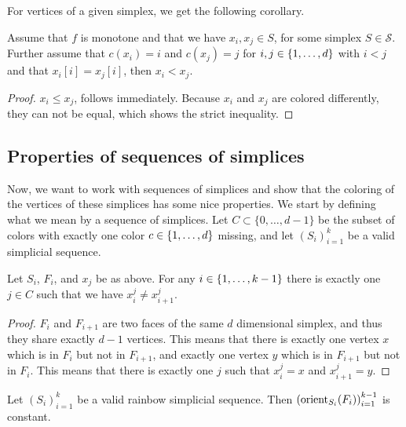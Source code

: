 For vertices of a given simplex, we get the following corollary.
\begin{corollary}\label{cor:monotone_coloring}
	Assume that $f$ is monotone and that we have $x_i, x_j \in S$, for some simplex $S\in \mathcal{S}$. Further assume that $c(x_i) = i$ and $c(x_j) = j$ for $i, j \in \left\{1, \dots, d\right\}$ with $i < j$ and that $x_i[i] = x_j[i]$, then $x_i < x_j$.
\end{corollary}
\begin{proof}
	$x_i \leq x_j$, follows immediately. Because $x_i$ and $x_j$ are colored differently, they can not be equal, which shows the strict inequality.
\end{proof}

\subsection{Properties of sequences of simplices}

Now, we want to work with sequences of simplices and show that the coloring of the vertices of these simplices has some nice properties. We start by defining what we mean by a sequence of simplices. Let $C \subset \{0, \dots, d-1\}$ be the subset of colors with exactly one color $c \in \left\{1, \dots, d\right\}$ missing, and let ${\left(S_i\right)}_{i=1}^k$ be a valid simplicial sequence.
\begin{lemma}
	Let $S_i$, $F_i$, and $x_j$ be as above. For any $i \in \left\{1, \dots, k-1\right\}$ there is exactly one $j \in C$ such that we have $x_i^j \neq x_{i+1}^j$.
\end{lemma}
\begin{proof}
	$F_i$ and $F_{i+1}$ are two faces of the same $d$ dimensional simplex, and thus they share exactly $d-1$ vertices. This means that there is exactly one vertex $x$ which is in $F_i$ but not in $F_{i+1}$, and exactly one vertex $y$ which is in $F_{i+1}$ but not in $F_i$. This means that there is exactly one $j$ such that $x_i^j = x$ and $x_{i+1}^j = y$.
\end{proof}

\begin{lemma}\label{lem:consistent_orientation_of_transition_faces}
	Let ${\left(S_i\right)}_{i=1}^{k}$ be a valid rainbow simplicial sequence. Then ${\left(\operatorname{orient}_{S_i}(F_i)\right)}_{i=1}^{k-1}$ is constant.
\end{lemma}

